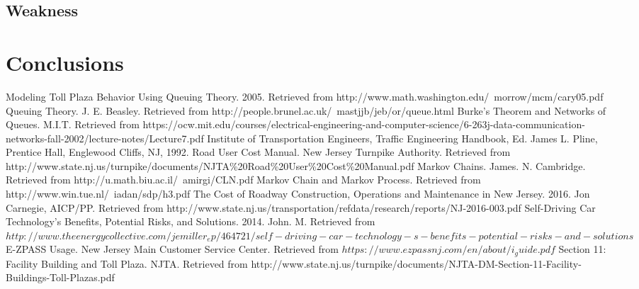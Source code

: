 \subsection{Weakness}

\section{Conclusions}

\begin{thebibliography}{99}
\raggedright
{} Modeling Toll Plaza Behavior Using Queuing Theory. 2005. Retrieved from http://www.math.washington.edu/~morrow/mcm/cary05.pdf
 Queuing Theory. J. E. Beasley. Retrieved from http://people.brunel.ac.uk/~mastjjb/jeb/or/queue.html
 Burke's Theorem and Networks of Queues. M.I.T. Retrieved from https://ocw.mit.edu/courses/electrical-engineering-and-computer-science/6-263j-data-communication-networks-fall-2002/lecture-notes/Lecture7.pdf
 Institute of Transportation Engineers, Traffic Engineering Handbook, Ed. James L. Pline, Prentice Hall, Englewood Cliffs, NJ, 1992.
 Road User Cost Manual. New Jersey Turnpike Authority. Retrieved from http://www.state.nj.us/turnpike/documents/NJTA\%20Road\%20User\%20Cost\%20Manual.pdf
 Markov Chains. James. N. Cambridge. Retrieved from http://u.math.biu.ac.il/~amirgi/CLN.pdf
 Markov Chain and Markov Process. Retrieved from http://www.win.tue.nl/~iadan/sdp/h3.pdf
 The Cost of Roadway Construction, Operations and Maintenance in New Jersey. 2016. Jon Carnegie, AICP/PP. Retrieved from http://www.state.nj.us/transportation/refdata/research/reports/NJ-2016-003.pdf
 Self-Driving Car Technology’s Benefits, Potential Risks, and Solutions. 2014. John. M. Retrieved from $http://www.theenergycollective.com/jemiller_ep/464721/self-driving-car-technology-s-benefits-potential-risks-and-solutions$
 E-ZPASS Usage. New Jersey Main Customer Service Center. Retrieved from $https://www.ezpassnj.com/en/about/i_guide.pdf$
 Section 11: Facility Building and Toll Plaza. NJTA. Retrieved from http://www.state.nj.us/turnpike/documents/NJTA-DM-Section-11-Facility-Buildings-Toll-Plazas.pdf
\end{thebibliography}